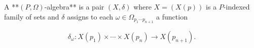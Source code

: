 A **$(P, \Omega)$-algebra** is a pair $(X, \delta)$ where $X = (X(p))$ is a $P$-indexed family of sets and $\delta$ assigns to each $\omega \in \Omega_{p_1 \cdots p_{n+1}}$ a function

$$\delta_\omega: X(p_1) \times \cdots \times X(p_n) \rightarrow X(p_{n+1}).$$

